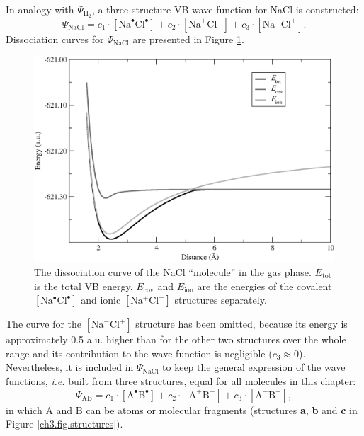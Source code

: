 In analogy with $\Psi_{\mathrm{H_2}}$, a three structure VB wave function for NaCl is constructed:
\begin{equation}
\nonumber
\Psi_{\mathrm{NaCl}} = c_1\cdot [\mathrm{Na}^\bullet \mathrm{Cl}^\bullet] + c_2 \cdot [\mathrm{Na}^{+}\mathrm{Cl}^{-}] + c_3 \cdot [\mathrm{Na}^{-}\mathrm{Cl}^{+}]. 
\end{equation}
Dissociation curves for $\Psi_{\mathrm{NaCl}}$ are presented in Figure \ref{ch3.fig.nacl_c}.
\begin{figure}[hbtp]
\begin{center}
\includegraphics[scale=0.6]{dissociation/figures/nacl_g.eps}
\end{center}
\caption{The dissociation curve of the NaCl ``molecule'' in the gas phase. $E_\mathrm{tot}$ is the total VB energy, $E_\mathrm{cov}$  and $E_\mathrm{ion}$ are the energies of the covalent $[\mathrm{Na^\bullet Cl^\bullet}]$ and ionic $[\mathrm{Na^{+}Cl^{-}}]$ structures separately.}
\label{ch3.fig.nacl_c}
\end{figure}
The curve for the $[\mathrm{Na}^{-}\mathrm{Cl}^{+}]$ structure has been omitted, because its energy is approximately 0.5 a.u. higher than for the other two structures over the whole range and its contribution to the wave function is negligible ($c_3 \approx 0$). Nevertheless, it is included in $\Psi_{\mathrm{NaCl}}$ to keep the general expression of the wave functions, \textit{i.e.} built from three structures, equal for all molecules in this chapter:
\begin{equation}
\nonumber
\Psi_{\mathrm{AB}} = c_1\cdot [\mathrm{A}^\bullet \mathrm{B}^\bullet] + c_2 \cdot [\mathrm{A}^{+}\mathrm{B}^{-}] 
+ c_3 \cdot [\mathrm{A}^{-}\mathrm{B}^{+}],
\end{equation}
in which $\mathrm{A}$ and $\mathrm{B}$ can be atoms or molecular fragments (structures \textbf{a}, \textbf{b} and \textbf{c} in Figure \ref{ch3.fig.structures}).

